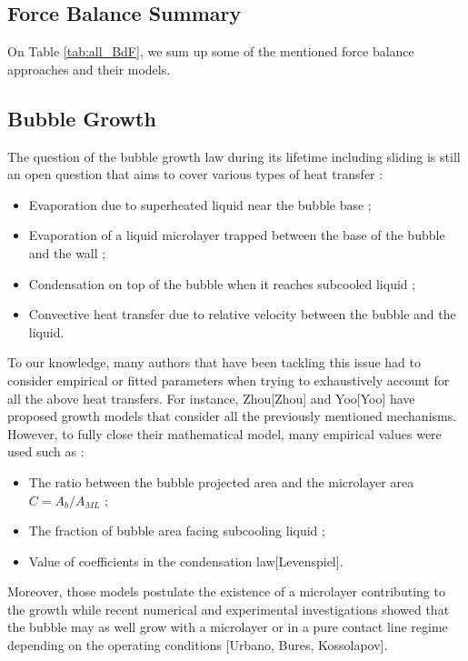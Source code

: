 \subsection{Force Balance Summary}\label{subsec:BdF}


On Table \ref{tab:all_BdF}, we sum up some of the mentioned force balance approaches and their models.






\subsection{Bubble Growth}\label{subsec:bub_growth}

The question of the bubble growth law during its lifetime including sliding is still an open question that aims to cover various types of heat transfer :

\begin{itemize}
\item Evaporation due to superheated liquid near the bubble base ;
\item Evaporation of a liquid microlayer trapped between the base of the bubble and the wall ;
\item Condensation on top of the bubble when it reaches subcooled liquid ;
\item Convective heat transfer due to relative velocity between the bubble and the liquid.
\end{itemize}

To our knowledge, many authors that have been tackling this issue had to consider empirical or fitted parameters when trying to exhaustively account for all the above heat transfers. For instance, Zhou[Zhou] and Yoo[Yoo] have proposed growth models that consider all the previously mentioned mechanisms. However, to fully close their mathematical model, many empirical values were used such as :

\begin{itemize}
\item The ratio between the bubble projected area and the microlayer area $C= A_{b}/A_{ML}$ ;
\item The fraction of bubble area facing subcooling liquid ;
\item Value of coefficients in the condensation law[Levenspiel].
\end{itemize}

Moreover, those models postulate the existence of a microlayer contributing to the growth while recent numerical and experimental investigations showed that the bubble may as well grow with a microlayer or in a pure contact line regime depending on the operating conditions [Urbano, Bures, Kossolapov].

